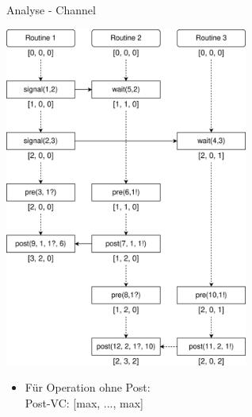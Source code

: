 \documentclass[aspectratio=169]{beamer}  %
\begin{document}


\begin{frame}{Analyse - Channel}
  \begin{minipage}{0.49\textwidth}
  \centering
  \includegraphics[width=0.6\textwidth]{img/vc.eps}
  \end{minipage}
  \hfill
  \hfill
  \begin{minipage}{0.49\textwidth}
    \begin{itemize}
      \item<3> Für Operation ohne Post:\\Post-VC: [max, ..., max]
    \end{itemize}
  \end{minipage}
\end{frame}
\end{document}
